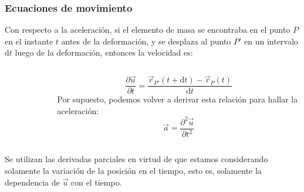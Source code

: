 \documentclass[11pt,handout,aspectratio=1610]{beamer}
\newcommand{\diff}[0]{\text{d}}
\newcommand{\pdiff}[2]{\frac{\partial #1}{\partial #2}}
\newcommand{\pddiff}[2]{\frac{\partial^2 #1}{\partial #2^2}}
\begin{document}
\begin{frame}
    \frametitle{Ecuaciones de movimiento}

    Con respecto a la aceleración, si el elemento de masa se encontraba en el punto $P$ en el instante $t$ antes de la deformación, y se desplaza al punto $P'$ en un intervalo $\diff t$ luego de la deformación, entonces la velocidad es:

    \begin{columns}
        \begin{column}{0.45\textwidth}
            \begin{figure}
                \centering
            \end{figure}
        \end{column}
        \begin{column}{0.45\textwidth}
             $$ \pdiff{\vec{u}}{t} = \frac{\vec{r}_{P'} \left(t+\diff t\right) - \vec{r}_P \left(t\right)}{\diff t} $$ Por supuesto, podemos volver a derivar esta relación para hallar la aceleración: $$ \vec{a} = \pddiff{\vec{u}}{t} $$
        \end{column}
    \end{columns}

    Se utilizan las derivadas parciales en virtud de que estamos considerando solamente la variación de la posición en el tiempo, esto es, solamente la dependencia de $\vec{u}$ con el tiempo.
\end{frame}
\end{document}

